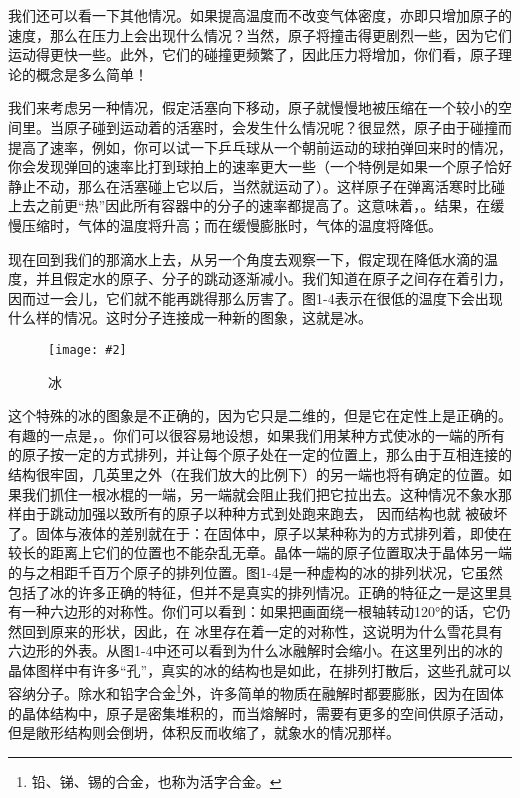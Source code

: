 \documentclass[12pt,oneside]{book}
\newenvironment{fig}[2][1]
{\begin{figure}[H]
\centering
\texttt{[image: \#2]}}
{\end{figure}}
\begin{document}
我们还可以看一下其他情况。如果提高温度而不改变气体密度，亦即只增加原子的速度，那么在压力上会出现什么情况？当然，原子将撞击得更剧烈一些，因为它们运动得更快一些。此外，它们的碰撞更频繁了，因此压力将增加，你们看，原子理论的概念是多么简单！

我们来考虑另一种情况，假定活塞向下移动，原子就慢慢地被压缩在一个较小的空间里。当原子碰到运动着的活塞时，会发生什么情况呢？很显然，原子由于碰撞而提高了速率，例如，你可以试一下乒乓球从一个朝前运动的球拍弹回来时的情况，你会发现弹回的速率比打到球拍上的速率更大一些（一个特例是如果一个原子恰好静止不动，那么在活塞碰上它以后，当然就运动了）。这样原子在弹离活寒时比碰上去之前更“热”因此所有容器中的分子的速率都提高了。这意味着，。结果，在缓慢压缩时，气体的温度将升高；而在缓慢膨胀时，气体的温度将降低。

现在回到我们的那滴水上去，从另一个角度去观察一下，假定现在降低水滴的温度，并且假定水的原子、分子的跳动逐渐减小。我们知道在原子之间存在着引力，因而过一会儿，它们就不能再跳得那么厉害了。图1-4表示在很低的温度下会出现什么样的情况。这时分子连接成一种新的图象，这就是冰。
\begin{fig}{冰}
\caption{冰}
\label{fig:冰}
\end{fig}
这个特殊的冰的图象是不正确的，因为它只是二维的，但是它在定性上是正确的。有趣的一点是，。你们可以很容易地设想，如果我们用某种方式使冰的一端的所有的原子按一定的方式排列，并让每个原子处在一定的位置上，那么由于互相连接的结构很牢固，几英里之外（在我们放大的比例下）的另一端也将有确定的位置。如果我们抓住一根冰棍的一端，另一端就会阻止我们把它拉出去。这种情况不象水那样由于跳动加强以致所有的原子以种种方式到处跑来跑去， 因而结构也就
被破坏了。固体与液体的差别就在于：在固体中，原子以某种称为的方式排列着，即使在较长的距离上它们的位置也不能杂乱无章。晶体一端的原子位置取决于晶体另一端的与之相距千百万个原子的排列位置。图1-4是一种虚构的冰的排列状况，它虽然包括了冰的许多正确的特征，但并不是真实的排列情况。正确的特征之一是这里具有一种六边形的对称性。你们可以看到：如果把画面绕一根轴转动120°的话，它仍然回到原来的形状，因此，在
冰里存在着一定的对称性，这说明为什么雪花具有六边形的外表。从图1-4中还可以看到为什么冰融解时会缩小。在这里列出的冰的晶体图样中有许多“孔”，真实的冰的结构也是如此，在排列打散后，这些孔就可以容纳分子。除水和铅字合金\footnote{铅、锑、锡的合金，也称为活字合金。}外，许多简单的物质在融解时都要膨胀，因为在固体的晶体结构中，原子是密集堆积的，而当熔解时，需要有更多的空间供原子活动，但是敞形结构则会倒坍，体积反而收缩了，就象水的情况那样。
\end{document}
